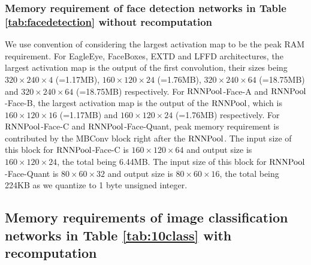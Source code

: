 \documentclass[10pt]{article}
\newcommand{\rpool}{\ensuremath{{\rm RNNPool}}\xspace}
\begin{document}
\subsubsection{Memory requirement of  face detection networks in Table \ref{tab:facedetection} without recomputation}
We use convention of considering the largest activation map to be the
peak RAM requirement. For EagleEye, FaceBoxes, EXTD and LFFD
architectures, the largest activation map is the output of the first
convolution, their sizes being $320 \times 240 \times 4$ (=1.17MB),
$160 \times 120 \times 24$ (=1.76MB), $320 \times 240 \times 64$
(=18.75MB) and $320 \times 240 \times 64$ (=18.75MB) respectively. For
\rpool-Face-A and \rpool-Face-B, the largest activation map is the
output of the \rpool, which is $160 \times 120 \times 16$ (=1.17MB)
and $160 \times 120 \times 24$ (=1.76MB) respectively.  For
\rpool-Face-C and \rpool-Face-Quant, peak memory requirement is
contributed by the MBConv block right after the \rpool. The input size
of this block for \rpool-Face-C is $160 \times 120 \times 64$ and
output size is $160 \times 120 \times 24$, the total being 6.44MB. The
input size of this block for \rpool-Face-Quant is $80 \times 60 \times
32$ and output size is $80 \times 60 \times 16$, the total being 224KB
as we quantize to 1 byte unsigned integer.


\subsection{Memory requirements of image classification networks in Table \ref{tab:10class} with recomputation}
\label{sec:with-recomp}
\end{document}
